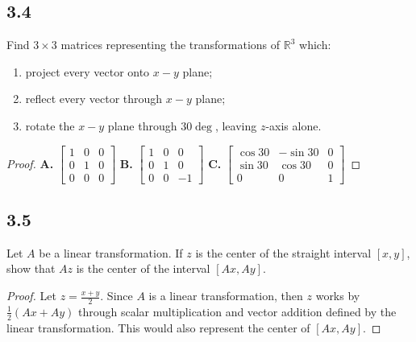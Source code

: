 \documentclass{amsart}
\begin{document}
\subsection*{3.4} Find $3 \times 3$ matrices representing the transformations of $\mathbb{R}^3$ which: 
\begin{enumerate}[label=\alph*)]
\item project every vector onto $x-y$ plane;
\item reflect every vector through $x-y$ plane;
\item rotate the $x-y$ plane through $30 \deg $, leaving $z$-axis alone.
\end{enumerate}
\begin{proof}
    \textbf{A.} $\begin{bmatrix} 1 &0 & 0 \\ 0 & 1 & 0 \\ 0& 0 & 0 \end{bmatrix}$ \textbf{B.} $\begin{bmatrix} 1 &0 & 0 \\ 0 & 1 & 0 \\ 0& 0 & -1  \end{bmatrix}$ \textbf{C.} $\begin{bmatrix} \cos 30 & -\sin 30 & 0 \\ \sin 30 & \cos 30 & 0 \\ 0 & 0 & 1 \end{bmatrix}$
\end{proof}
\subsection*{3.5} Let $A$ be a linear transformation. If $z$ is the center of the straight interval $[x,y]$, show that $Az$ is the center of the interval $[Ax,Ay]$.
\begin{proof}
    Let $z = \frac{x+y}{2}$. Since $A$ is a linear transformation, then $z$ works by $\frac{1}{2}(Ax + Ay)$ through scalar multiplication and vector addition defined by the linear transformation. This would also represent the center of $[Ax,Ay]$.  
\end{proof} 
\end{document}
